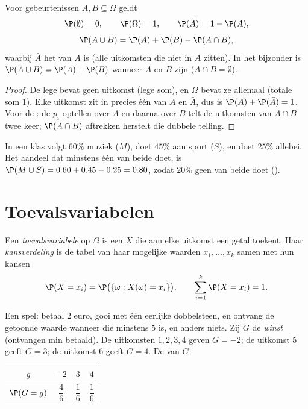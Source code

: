 \begin{proposition}\label{prop:g11:prob:rules}
Voor gebeurtenissen $A, B \subseteq \Omega$ geldt
\[
\P(\emptyset) = 0, \qquad \P(\Omega) = 1, \qquad
\P(\bar A) = 1 - \P(A),
\]
\[
\P(A \cup B) = \P(A) + \P(B) - \P(A \cap B),
\]
waarbij $\bar A$ het \emph{} van $A$ is (alle uitkomsten die niet
in $A$ zitten). In het bijzonder is $\P(A \cup B) = \P(A) + \P(B)$ wanneer
$A$ en $B$ \emph{} zijn ($A \cap B = \emptyset$).
\end{proposition}

\begin{proof}
De lege  bevat geen uitkomst (lege som), en $\Omega$ bevat ze
allemaal (totale som $1$). Elke uitkomst zit in precies één van $A$ en
$\bar A$, dus is $\P(A) + \P(\bar A) = 1$. Voor de : de $p_i$
optellen over $A$ en daarna over $B$ telt de uitkomsten van $A \cap B$ twee
keer; $\P(A \cap B)$ aftrekken herstelt die dubbele telling.
\end{proof}

\begin{example}
In een klas volgt $60\%$ muziek ($M$), doet $45\%$ aan sport ($S$), en doet
$25\%$ allebei. Het aandeel dat minstens één van beide doet, is
$\P(M \cup S) = 0.60 + 0.45 - 0.25 = 0.80$, zodat $20\%$ geen van beide doet
().
\end{example}

\section{Toevalsvariabelen}

\begin{definition}\label{def:g11:prob:rv}
Een \emph{toevalsvariabele} op $\Omega$ is een
 $X$ die aan elke uitkomst een getal toekent. Haar
\emph{kansverdeling} is de tabel van haar mogelijke
waarden $x_1, \dots, x_k$ samen met hun kansen
\[
\P(X = x_i) = \P\bigl(\{\omega : X(\omega) = x_i\}\bigr),
\qquad
\sum_{i=1}^k \P(X = x_i) = 1 .
\]
\end{definition}

\begin{example}\label{ex:g11:prob:game}
Een spel: betaal $2$ euro, gooi met één eerlijke dobbelsteen, en ontvang de
getoonde waarde wanneer die minstens $5$ is, en anders niets. Zij $G$ de
\emph{winst} (ontvangen min betaald). De uitkomsten $1, 2, 3, 4$ geven
$G = -2$; de uitkomst $5$ geeft $G = 3$; de uitkomst $6$ geeft $G = 4$. De
 van $G$:
\begin{center}
\begin{tabular}{c|ccc}
$g$ & $-2$ & $3$ & $4$\\
\hline\rule{0pt}{11pt}%
$\P(G = g)$ & $\dfrac46$ & $\dfrac16$ & $\dfrac16$
\end{tabular}
\end{center}
\end{example}


